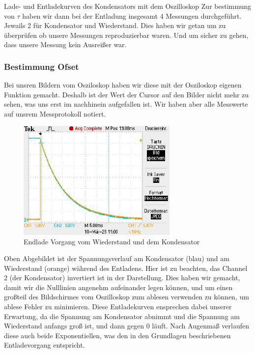 \documentclass[twoside]{protokoll}
\begin{document}
\begin{aufgabe}{Lade- und Entladekurven des Kondensators mit dem Oszilloskop}
Zur bestimmung von $\tau$ haben wir dann bei der Entladung insgesamt 4 Messungen durchgeführt. 
Jewails 2 für Kondensator und Wiederstand. Dies haben wir getan um zu überprüfen ob unsere Messungen reproduzierbar waren. 
Und um sicher zu gehen, dass unsere Messung kein Ausreißer war. 

\subsubsection{Bestimmung Ofset}

Bei unsren Bildern vom Osziloskop haben wir diese mit der Osziloskop eigenen Funktion gemacht.
Deshalb ist der Wert der Cursor auf den Bilder nicht mehr zu sehen, was uns erst im nachhinein aufgefallen ist.
Wir haben aber alle Messwerte auf unsrem Messprotokoll notiert.

\begin{figure}[H]
  \centering
    \includegraphics[width=0.7\textwidth]{Bilder_Osziloskop/Entladen_Kondensator_02.pdf}
    \caption{Endlade Vorgang vom Wiederstand und dem Kondensator}
  \centering
\end{figure}
Oben Abgebildet ist der Spannungsverlauf am Kondensator (blau) und am Wiederstand (orange) während des Entladens.
Hier ist zu beachten, das Channel 2 (der Kondensator) invertiert ist in der Darstellung.
Dies haben wir gemacht, damit wir die Nulllinien angenehm aufeinander legen können, und um einen großteil des Bildschirmes vom Oszilloskop zum ablesen verwenden zu können, um ablese Fehler zu minimieren.
Diese Entladekurven ensprechen dabei unserer Erwartung, da die Spannung am Kondensator abnimmt und die Spannung am Wiederstand anfangs groß ist, und dann gegen 0 läuft.
Nach Augenmaß verlaufen diese auch beide Exponentiellen, was den in den Grundlagen beschriebenen Entladevorgang entspricht.


\end{aufgabe}
\end{document}
